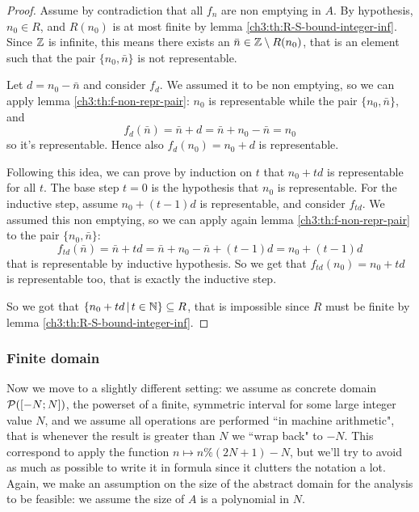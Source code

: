 \begin{proof}
	Assume by contradiction that all $f_n$ are non emptying in $A$.
	By hypothesis, $n_0 \in R$, and $R(n_0)$ is at most finite by lemma \ref{ch3:th:R-S-bound-integer-inf}. Since $\mathbb{Z}$ is infinite, this means there exists an $\bar{n} \in \mathbb{Z} \setminus R(n_0)$, that is an element such that the pair $\{ n_0, \bar{n} \}$ is not representable.

	Let $d = n_0 - \bar{n}$ and consider $f_d$. We assumed it to be non emptying, so we can apply lemma \ref{ch3:th:f-non-repr-pair}: $n_0$ is representable while the pair $\{ n_0, \bar{n} \}$, and 
	\[
	f_d(\bar{n}) = \bar{n} + d = \bar{n} + n_0 - \bar{n} = n_0
	\]
	so it's representable. Hence also $f_d(n_0) = n_0 + d$ is representable.
	
	Following this idea, we can prove by induction on $t$ that $n_0 + t d$ is representable for all $t$. The base step $t = 0$ is the hypothesis that $n_0$ is representable.
	For the inductive step, assume $n_0 + (t - 1) d$ is representable, and consider $f_{t d}$. We assumed this non emptying, so we can apply again lemma \ref{ch3:th:f-non-repr-pair} to the pair $\{ n_0, \bar{n} \}$:
	\[
	f_{t d}(\bar{n}) = \bar{n} + t d = \bar{n} + n_0 - \bar{n} + (t - 1) d = n_0 + (t - 1) d
	\]
	that is representable by inductive hypothesis. So we get that $f_{t d}(n_0) = n_0 + t d$ is representable too, that is exactly the inductive step.

	So we got that $\{ n_0 + t d \,\vert\, t \in \mathbb{N} \} \subseteq R$, that is impossible since $R$ must be finite by lemma \ref{ch3:th:R-S-bound-integer-inf}.
\end{proof}

\subsubsection{Finite domain}
Now we move to a slightly different setting: we assume as concrete domain $\mathcal{P}([-N; N])$, the powerset of a finite, symmetric interval for some large integer value $N$, and we assume all operations are performed ``in machine arithmetic", that is whenever the result is greater than $N$ we ``wrap back" to $-N$. This correspond to apply the function $n \mapsto n \% (2N + 1) - N$, but we'll try to avoid as much as possible to write it in formula since it clutters the notation a lot.
Again, we make an assumption on the size of the abstract domain for the analysis to be feasible: we assume the size of $A$ is a polynomial in $N$.

